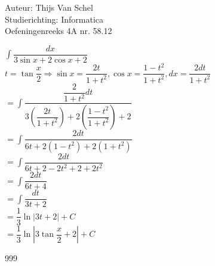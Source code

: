 \documentclass[a4paper]{article}
\newcommand{\dint}{\displaystyle\int}
\begin{document}
  
\noindent \large Auteur: Thijs Van Schel \\
\noindent \large Studierichting: Informatica\\
\noindent \large Oefeningenreeks 4A nr. 58.12\\

\medskip

\normalsize

$\dint \dfrac{dx}{3 \sin x + 2 \cos x + 2}$ \\

$t = \tan \dfrac{x}{2} \Rightarrow \sin x = \dfrac{2t}{1+t^2}, \cos x = \dfrac{1-t^2}{1+t^2}, dx = \dfrac{2 dt}{1+t^2}$ \\

$= \dint \dfrac{\dfrac{2}{1+t^2} dt}{3 \left( \dfrac{2t}{1+t^2} \right) + 2 \left( \dfrac{1-t^2}{1+t^2} \right) + 2}$ \\

$= \dint \dfrac{2 dt}{6t + 2(1-t^2) + 2(1+t^2)}$ \\

$= \dint \dfrac{2 dt}{6t + 2 - 2t^2 + 2 + 2t^2}$ \\

$= \dint \dfrac{2 dt}{6t + 4}$ \\

$= \dint \dfrac{dt}{3t + 2}$ \\

$= \dfrac{1}{3} \ln |3t + 2| + C$ \\

$= \dfrac{1}{3} \ln \left| 3 \tan \dfrac{x}{2} + 2 \right| + C$

\begin{thebibliography}{999}
\end{thebibliography}
\end{document}
